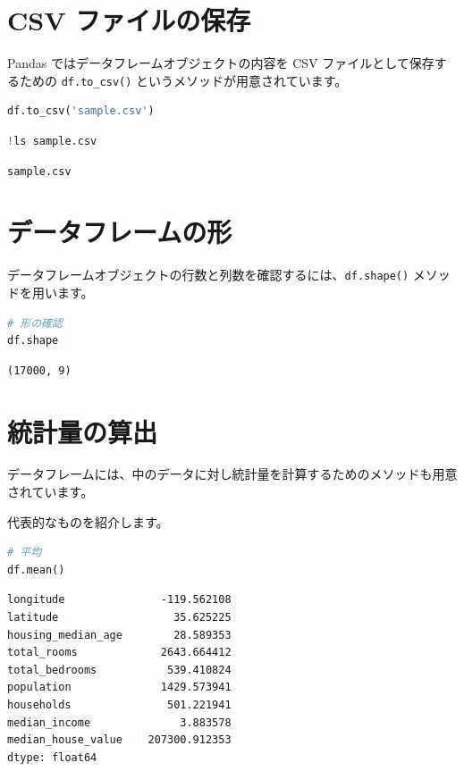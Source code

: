 \section{CSV ファイルの保存}


Pandas ではデータフレームオブジェクトの内容を CSV ファイルとして保存するための \texttt{df.to\_csv()} というメソッドが用意されています。


\begin{lstlisting}[style=codecell,language=Python]
df.to_csv('sample.csv')
\end{lstlisting}

\begin{lstlisting}[style=codecell,language=Python]
!ls sample.csv
\end{lstlisting}

\begin{lstlisting}[style=outputcell]
sample.csv
\end{lstlisting}

\section{データフレームの形}


データフレームオブジェクトの行数と列数を確認するには、\texttt{df.shape()} メソッドを用います。


\begin{lstlisting}[style=codecell,language=Python]
# 形の確認
df.shape
\end{lstlisting}

\begin{lstlisting}[style=outputcell]
(17000, 9)
\end{lstlisting}

\section{統計量の算出}


データフレームには、中のデータに対し統計量を計算するためのメソッドも用意されています。

代表的なものを紹介します。


\begin{lstlisting}[style=codecell,language=Python]
# 平均
df.mean()
\end{lstlisting}

\begin{lstlisting}[style=outputcell]
longitude               -119.562108
latitude                  35.625225
housing_median_age        28.589353
total_rooms             2643.664412
total_bedrooms           539.410824
population              1429.573941
households               501.221941
median_income              3.883578
median_house_value    207300.912353
dtype: float64
\end{lstlisting}

